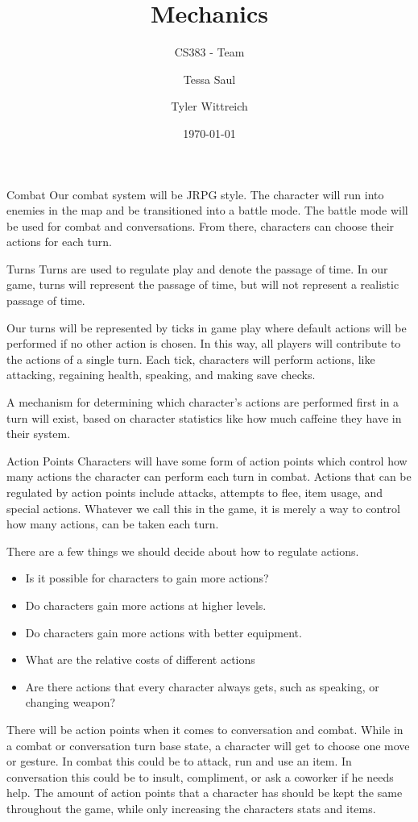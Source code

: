 \documentclass[12pt]{article}
\title{Mechanics}
\subtitle{CS383 - Team \testtt{\textasciicircum teamname}}
\date{\today}
\author{
Tessa Saul
\and Tyler Wittreich
}
\begin{document}
\maketitle

\begin{section}{Combat}
Our combat system will be JRPG style.  The character will run into enemies in
the map and be transitioned
into a battle mode. The battle mode will be used for combat and conversations.
From there, characters can choose their actions for each turn.
\end{section}

\begin{section}{Turns}
Turns are used to regulate play and denote the passage of time.  In our game,
turns will represent the passage of time, but will not represent a realistic
passage of time.

Our turns will be represented by ticks in game play where default
actions will be performed if no other action is chosen.  In this way, all
players will contribute to the actions of a single turn. Each tick, characters
will perform actions, like attacking,
regaining health, speaking, and making save checks.

A mechanism for determining which character's actions are performed
first in a turn will exist, based on character statistics like how much
caffeine they have in their system.
\end{section}

\begin{section}{Action Points}
Characters will have some form of action points which control how many actions
the character can perform each turn in combat. Actions
that can be regulated by action points include attacks, attempts to flee, item
usage, and special actions.  Whatever we call this in the game, it is merely a
way to control how many actions, can be taken each turn.

There are a few things we should decide about how to regulate actions.
\begin{itemize}
\item Is it possible for characters to gain more actions?
\item Do characters gain more actions at higher levels.
\item Do characters gain more actions with better equipment.
\item What are the relative costs of different actions
\item Are there actions that every character always gets, such as speaking, or changing weapon?
\end{itemize}

There will be action points when it comes to conversation and combat.
While in a combat or conversation turn base state, a character will get to
choose one move or gesture. In combat this could be to attack, run and use an
item. In conversation this could be to insult, compliment, or ask a coworker if
he needs help. The amount of action points that a character has should be kept
the same throughout the game, while only increasing the characters stats and
items.
\end{section}
\end{document}
